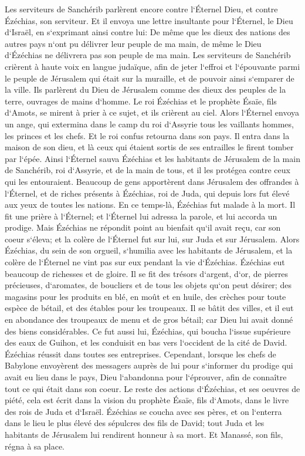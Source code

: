 \verse Les serviteurs de Sanchérib parlèrent encore contre l`Éternel Dieu, et contre Ézéchias, son serviteur. 
\verse Et il envoya une lettre insultante pour l`Éternel, le Dieu d`Israël, en s`exprimant ainsi contre lui: De même que les dieux des nations des autres pays n`ont pu délivrer leur peuple de ma main, de même le Dieu d`Ézéchias ne délivrera pas son peuple de ma main. 
\verse Les serviteurs de Sanchérib crièrent à haute voix en langue judaïque, afin de jeter l`effroi et l`épouvante parmi le peuple de Jérusalem qui était sur la muraille, et de pouvoir ainsi s`emparer de la ville. 
\verse Ils parlèrent du Dieu de Jérusalem comme des dieux des peuples de la terre, ouvrages de mains d`homme. 
\verse Le roi Ézéchias et le prophète Ésaïe, fils d`Amots, se mirent à prier à ce sujet, et ils crièrent au ciel. 
\verse Alors l`Éternel envoya un ange, qui extermina dans le camp du roi d`Assyrie tous les vaillants hommes, les princes et les chefs. Et le roi confus retourna dans son pays. Il entra dans la maison de son dieu, et là ceux qui étaient sortis de ses entrailles le firent tomber par l`épée. 
\verse Ainsi l`Éternel sauva Ézéchias et les habitants de Jérusalem de la main de Sanchérib, roi d`Assyrie, et de la main de tous, et il les protégea contre ceux qui les entouraient. 
\verse Beaucoup de gens apportèrent dans Jérusalem des offrandes à l`Éternel, et de riches présents à Ézéchias, roi de Juda, qui depuis lors fut élevé aux yeux de toutes les nations. 
\verse En ce temps-là, Ézéchias fut malade à la mort. Il fit une prière à l`Éternel; et l`Éternel lui adressa la parole, et lui accorda un prodige. 
\verse Mais Ézéchias ne répondit point au bienfait qu`il avait reçu, car son coeur s`éleva; et la colère de l`Éternel fut sur lui, sur Juda et sur Jérusalem. 
\verse Alors Ézéchias, du sein de son orgueil, s`humilia avec les habitants de Jérusalem, et la colère de l`Éternel ne vint pas sur eux pendant la vie d`Ézéchias. 
\verse Ézéchias eut beaucoup de richesses et de gloire. Il se fit des trésors d`argent, d`or, de pierres précieuses, d`aromates, de boucliers et de tous les objets qu`on peut désirer; 
\verse des magasins pour les produits en blé, en moût et en huile, des crèches pour toute espèce de bétail, et des étables pour les troupeaux. 
\verse Il se bâtit des villes, et il eut en abondance des troupeaux de menu et de gros bétail; car Dieu lui avait donné des biens considérables. 
\verse Ce fut aussi lui, Ézéchias, qui boucha l`issue supérieure des eaux de Guihon, et les conduisit en bas vers l`occident de la cité de David. Ézéchias réussit dans toutes ses entreprises. 
\verse Cependant, lorsque les chefs de Babylone envoyèrent des messagers auprès de lui pour s`informer du prodige qui avait eu lieu dans le pays, Dieu l`abandonna pour l`éprouver, afin de connaître tout ce qui était dans son coeur. 
\verse Le reste des actions d`Ézéchias, et ses oeuvres de piété, cela est écrit dans la vision du prophète Ésaïe, fils d`Amots, dans le livre des rois de Juda et d`Israël. 
\verse Ézéchias se coucha avec ses pères, et on l`enterra dans le lieu le plus élevé des sépulcres des fils de David; tout Juda et les habitants de Jérusalem lui rendirent honneur à sa mort. Et Manassé, son fils, régna à sa place. 

